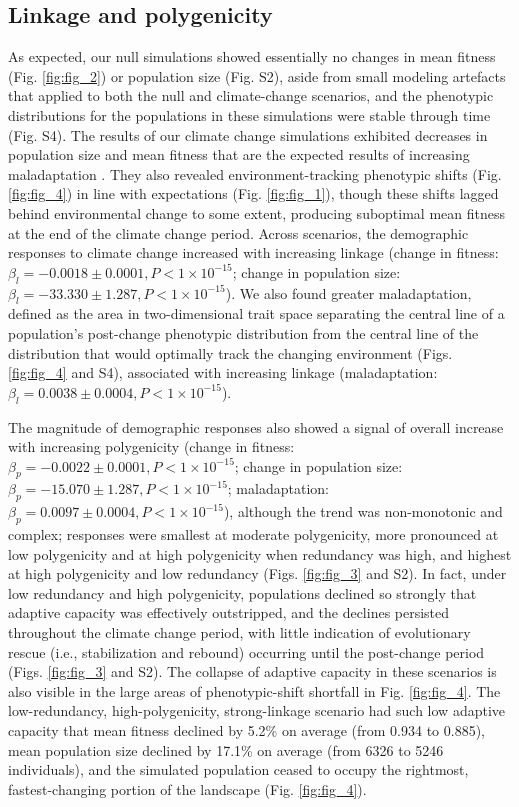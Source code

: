 \documentclass[9pt,twocolumn,twoside,lineno]{new_article}
\begin{document}
\subsection*{Linkage and polygenicity}
As expected, our null simulations showed essentially no changes
in mean fitness (Fig. \ref{fig:fig_2}) or population size (Fig. S2), aside from small modeling artefacts that applied to both the 
null and climate-change scenarios, and the phenotypic distributions for the populations in these simulations were
stable through time (Fig. S4).
The results of our climate change simulations exhibited
decreases in population size and mean fitness
that are the expected results of increasing maladaptation \cite{aitken_whitlock}.
They also revealed environment-tracking phenotypic shifts (Fig. \ref{fig:fig_4})
in line with expectations (Fig. \ref{fig:fig_1}),
though these shifts lagged behind environmental change to some extent,
producing suboptimal mean fitness at the end of the climate change period.
Across scenarios, the demographic responses to
climate change increased with increasing linkage
(change in fitness: $\beta_{l} = -0.0018\pm0.0001, P<1\times10^{-15}$;
change in population size: $\beta_{l} = -33.330\pm1.287, P<1\times10^{-15}$).
We also found greater maladaptation, defined as the area in two-dimensional trait space separating the central line
of a population's post-change phenotypic distribution from the central line of the distribution
that would optimally track the changing environment (Figs. \ref{fig:fig_4} and S4), associated with increasing linkage (maladaptation: $\beta_{l} = 0.0038\pm0.0004, P<1\times10^{-15}$).

The magnitude of demographic responses also showed a signal of overall increase with increasing polygenicity
(change in fitness: $\beta_{p} = -0.0022\pm0.0001, P<1\times10^{-15}$;
change in population size: $\beta_{p} = -15.070\pm1.287, P<1\times10^{-15}$;
maladaptation: $\beta_{p} = 0.0097\pm0.0004, P<1\times10^{-15}$),
although the trend was non-monotonic and complex; responses were smallest at moderate polygenicity,
more pronounced at low polygenicity and at high polygenicity when redundancy was high,
and highest at high polygenicity and low redundancy (Figs. \ref{fig:fig_3} and S2).
In fact, under low redundancy and high polygenicity,
populations declined so strongly that adaptive capacity was effectively outstripped,
and the declines persisted throughout
the climate change period, with little indication of evolutionary rescue
(i.e., stabilization and rebound) occurring until the post-change period (Figs. \ref{fig:fig_3} and S2).
The collapse of adaptive capacity in these scenarios
is also visible in the large areas of phenotypic-shift shortfall in Fig. \ref{fig:fig_4}.
The low-redundancy, high-polygenicity, strong-linkage scenario had such low adaptive capacity
that mean fitness declined by 5.2\% on average (from 0.934 to 0.885),
mean population size declined by 17.1\% on average (from 6326 to 5246 individuals),
and the simulated population ceased to occupy the rightmost, fastest-changing portion of the landscape (Fig. \ref{fig:fig_4}).
\end{document}
